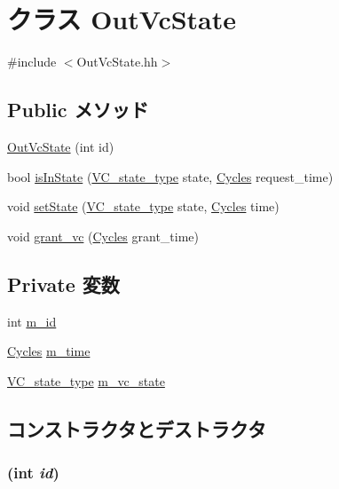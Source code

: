 \hypertarget{classOutVcState}{
\section{クラス OutVcState}
\label{classOutVcState}
}


{\ttfamily \#include $<$OutVcState.hh$>$}\subsection*{Public メソッド}
\begin{DoxyCompactItemize}
\item 
\hyperlink{classOutVcState_a91e46a3f132e8b7b4515eb27a1c51f52}{OutVcState} (int id)
\item 
bool \hyperlink{classOutVcState_ac76622b1411a4bb60ccc5ed355bc9645}{isInState} (\hyperlink{NetworkHeader_8hh_aaafaa208359111dcd9f4d47ff377da76}{VC\_\-state\_\-type} state, \hyperlink{classCycles}{Cycles} request\_\-time)
\item 
void \hyperlink{classOutVcState_a4ac4ce58e7eac1aee69c9891552538ec}{setState} (\hyperlink{NetworkHeader_8hh_aaafaa208359111dcd9f4d47ff377da76}{VC\_\-state\_\-type} state, \hyperlink{classCycles}{Cycles} time)
\item 
void \hyperlink{classOutVcState_ad463b42fe5ba1c0517ab0686facec633}{grant\_\-vc} (\hyperlink{classCycles}{Cycles} grant\_\-time)
\end{DoxyCompactItemize}
\subsection*{Private 変数}
\begin{DoxyCompactItemize}
\item 
int \hyperlink{classOutVcState_aad966617e7e050bedbead762727808a5}{m\_\-id}
\item 
\hyperlink{classCycles}{Cycles} \hyperlink{classOutVcState_ac39faf9ea84c2e7518ba2f960c661636}{m\_\-time}
\item 
\hyperlink{NetworkHeader_8hh_aaafaa208359111dcd9f4d47ff377da76}{VC\_\-state\_\-type} \hyperlink{classOutVcState_a86eb725d7cda610fb5009d20a3690a4d}{m\_\-vc\_\-state}
\end{DoxyCompactItemize}


\subsection{コンストラクタとデストラクタ}
\hypertarget{classOutVcState_a91e46a3f132e8b7b4515eb27a1c51f52}{
\subsubsection[{OutVcState}]{ (int {\em id})}}
\label{classOutVcState_a91e46a3f132e8b7b4515eb27a1c51f52}



